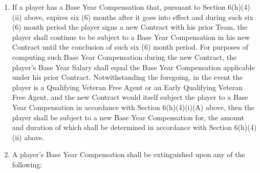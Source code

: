 \documentclass[
]{book}
\begin{document}
\begin{enumerate}
\begin{enumerate}
\begin{enumerate}
    \item
      If a player has a Base Year Compensation that, pursuant to Section 6(h)(4)(ii) above, expires six (6) months after it goes into effect and during such six (6) month period the player signs a new Contract with his prior Team, the player shall continue to be subject to a Base Year Compensation in his new Contract until the conclusion of such six (6) month period. For purposes of computing such Base Year Compensation during the new Contract, the player's Base Year Salary shall equal the Base Year Compensation applicable under his prior Contract. Notwithstanding the foregoing, in the event the player is a Qualifying Veteran Free Agent or an Early Qualifying Veteran Free Agent, and the new Contract would itself subject the player to a Base Year Compensation in accordance with Section 6(h)(4)(i)(A) above, then the player shall be subject to a new Base Year Compensation for, the amount and duration of which shall be determined in accordance with Section 6(h)(4)(ii) above.
    \item
      A player's Base Year Compensation shall be extinguished upon any of the following:


\end{enumerate}
\end{enumerate}
\end{enumerate}
\end{document}
